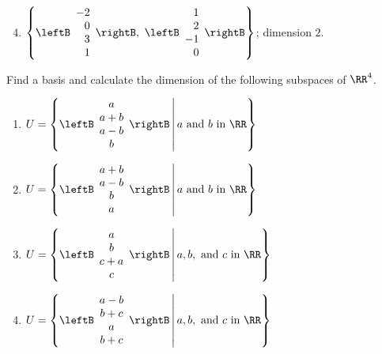 \begin{multicols}{2}
\begin{ex}
\begin{sol}
\begin{enumerate}[label={\alph*.}]
\setcounter{enumi}{3}
\item  
$\left \{
\leftB \begin{array}{r}
-2 \\
0 \\
3 \\
1
\end{array} \rightB
,\
\leftB \begin{array}{r}
1 \\
2 \\
-1 \\
0
\end{array} \rightB
\right \}$; dimension $2$.
\end{enumerate}
\end{sol}
\end{ex}

\begin{ex}
Find a basis and calculate the dimension of the following subspaces of $\RR^4$.

\begin{enumerate}[label={\alph*.}]
\item 
$U = \left \{
\leftB \begin{array}{c}
	a \\
	a + b \\
	a - b \\
	b
\end{array} \rightB \,
\middle| \, a \mbox{ and } b \mbox{ in } \RR
\right \} $

\item %
$U = \left \{
\leftB \begin{array}{c}
a + b\\
a - b \\
b \\
a
\end{array} \rightB \,
\middle| \, a \mbox{ and } b \mbox{ in } \RR
\right \} $

\item %
$U = \left \{
\leftB \begin{array}{c}
a \\
b \\
c + a \\
c
\end{array} \rightB \,
\middle| \, a, b, \mbox{ and } c \mbox{ in } \RR
\right \}$

\item %
$U = \left \{
\leftB \begin{array}{c}
a - b\\
b + c \\
a \\
b + c
\end{array} \rightB \,
\middle| \, a, b, \mbox{ and } c \mbox{ in } \RR
\right \} $


\end{enumerate}
\end{ex}
\end{multicols}
